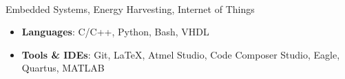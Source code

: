\documentclass{article}
\begin{document}
\vspace*{140pt}
\underline{}\\
\vspace{0mm}

\vspace{-2.6mm}Embedded Systems, Energy Harvesting, Internet of Things\\


\vspace{-2mm}\underline{}

\vspace{-2mm}\begin{itemize}[leftmargin=3.5mm]
	\setlength{\itemsep}{1mm}
	\item \textbf{Languages}: C/C++, Python, Bash, VHDL 
	\vspace{-2mm}
	\item\textbf{Tools \& IDEs}: Git, \LaTeX, Atmel Studio, Code Composer Studio, Eagle, Quartus, MATLAB 
\end{itemize}
\end{document}
